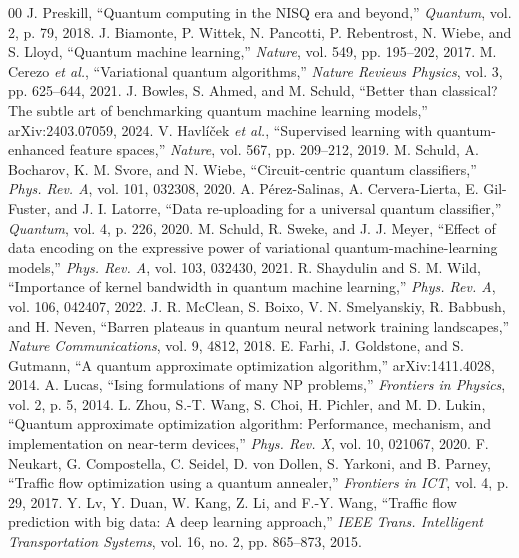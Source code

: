 \documentclass[conference]{IEEEtran}
\begin{document}
\begin{thebibliography}{00}
 J. Preskill, ``Quantum computing in the NISQ era and beyond,'' \emph{Quantum}, vol. 2, p. 79, 2018.
 J. Biamonte, P. Wittek, N. Pancotti, P. Rebentrost, N. Wiebe, and S. Lloyd, ``Quantum machine learning,'' \emph{Nature}, vol. 549, pp. 195--202, 2017.
 M. Cerezo \emph{et al.}, ``Variational quantum algorithms,'' \emph{Nature Reviews Physics}, vol. 3, pp. 625--644, 2021.
 J. Bowles, S. Ahmed, and M. Schuld, ``Better than classical? The subtle art of benchmarking quantum machine learning models,'' arXiv:2403.07059, 2024.
 V. Havl\'{i}\v{c}ek \emph{et al.}, ``Supervised learning with quantum-enhanced feature spaces,'' \emph{Nature}, vol. 567, pp. 209--212, 2019.
 M. Schuld, A. Bocharov, K. M. Svore, and N. Wiebe, ``Circuit-centric quantum classifiers,'' \emph{Phys. Rev. A}, vol. 101, 032308, 2020.
 A. P\'{e}rez-Salinas, A. Cervera-Lierta, E. Gil-Fuster, and J. I. Latorre, ``Data re-uploading for a universal quantum classifier,'' \emph{Quantum}, vol. 4, p. 226, 2020.
 M. Schuld, R. Sweke, and J. J. Meyer, ``Effect of data encoding on the expressive power of variational quantum-machine-learning models,'' \emph{Phys. Rev. A}, vol. 103, 032430, 2021.
 R. Shaydulin and S. M. Wild, ``Importance of kernel bandwidth in quantum machine learning,'' \emph{Phys. Rev. A}, vol. 106, 042407, 2022.
 J. R. McClean, S. Boixo, V. N. Smelyanskiy, R. Babbush, and H. Neven, ``Barren plateaus in quantum neural network training landscapes,'' \emph{Nature Communications}, vol. 9, 4812, 2018.
 E. Farhi, J. Goldstone, and S. Gutmann, ``A quantum approximate optimization algorithm,'' arXiv:1411.4028, 2014.
 A. Lucas, ``Ising formulations of many NP problems,'' \emph{Frontiers in Physics}, vol. 2, p. 5, 2014.
 L. Zhou, S.-T. Wang, S. Choi, H. Pichler, and M. D. Lukin, ``Quantum approximate optimization algorithm: Performance, mechanism, and implementation on near-term devices,'' \emph{Phys. Rev. X}, vol. 10, 021067, 2020.
 F. Neukart, G. Compostella, C. Seidel, D. von Dollen, S. Yarkoni, and B. Parney, ``Traffic flow optimization using a quantum annealer,'' \emph{Frontiers in ICT}, vol. 4, p. 29, 2017.
 Y. Lv, Y. Duan, W. Kang, Z. Li, and F.-Y. Wang, ``Traffic flow prediction with big data: A deep learning approach,'' \emph{IEEE Trans. Intelligent Transportation Systems}, vol. 16, no. 2, pp. 865--873, 2015.

\end{thebibliography}
\end{document}
